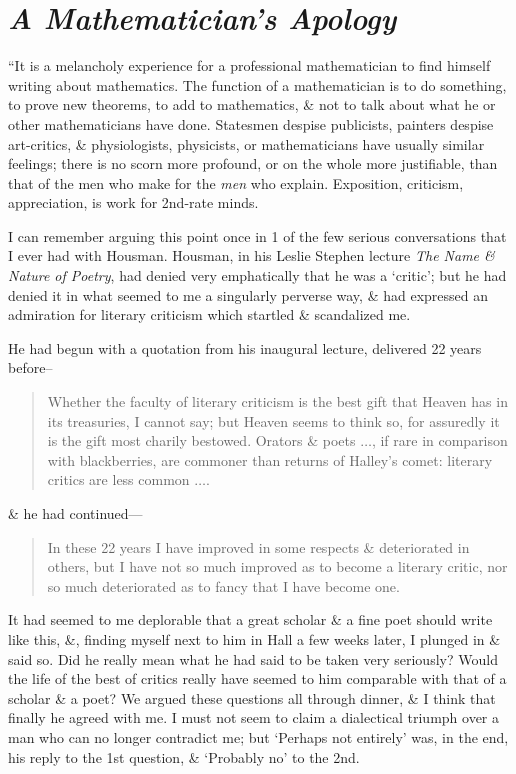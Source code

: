 \documentclass{article}
\numberwithin{equation}{section}
\begin{document}
\section{\textit{A Mathematician's Apology}}
 ``It is a melancholy experience for a professional mathematician to find himself writing about mathematics. The function of a mathematician is to do something, to prove new theorems, to add to mathematics, \& not to talk about what he or other mathematicians have done. Statesmen despise publicists, painters despise art-critics, \& physiologists, physicists, or mathematicians have usually similar feelings; there is no scorn more profound, or on the whole more justifiable, than that of the men who make for the \textit{men} who explain. Exposition, criticism, appreciation, is work for 2nd-rate minds.

I can remember arguing this point once in 1 of the few serious conversations that I ever had with Housman. Housman, in his Leslie Stephen lecture \textit{The Name \& Nature of Poetry}, had denied very emphatically that he was a `critic'; but he had denied it in what seemed to me a singularly perverse way, \& had expressed an admiration for literary criticism which startled \& scandalized me.

He had begun with a quotation from his inaugural lecture, delivered 22 years before--
\begin{quotation}
	Whether the faculty of literary criticism is the best gift that Heaven has in its treasuries, I cannot say; but Heaven seems to think so, for assuredly it is the gift most charily bestowed. Orators \& poets $\ldots$, if rare in comparison with blackberries, are commoner than returns of Halley's comet: literary critics are less common $\ldots$.
\end{quotation}
\& he had continued---
\begin{quotation}
	In these 22 years I have improved in some respects \& deteriorated in others, but I have not so much improved as to become a literary critic, nor so much deteriorated as to fancy that I have become one.
\end{quotation}
It had seemed to me deplorable that a great scholar \& a fine poet should write like this, \&, finding myself next to him in Hall a few weeks later, I plunged in \& said so. Did he really mean what he had said to be taken very seriously? Would the life of the best of critics really have seemed to him comparable with that of a scholar \& a poet? We argued these questions all through dinner, \& I think that finally he agreed with me. I must not seem to claim a dialectical triumph over a man who can no longer contradict me; but `Perhaps not entirely' was, in the end, his reply to the 1st question, \& `Probably no' to the 2nd.
\end{document}
